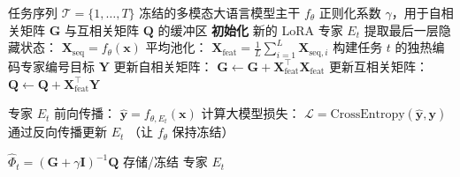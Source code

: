 \begin{algorithm}[t]
\caption{基于 CF-Router 的终身学习（训练阶段）。本算法为统一框架（算法~\ref{alg:cfcl}）在专家路由场景下的具体实例化：累积统计量 $\mathbf{G}$ 与第三章的 $\Psi^{-1}$ 之间满足 $\mathbf{G}=\Psi^{-1}-\gamma\mathbf{I}$，互相关矩阵 $\mathbf{Q}$ 与第三章 $\mathbf{Q}_t$ 同义；最终路由头 $\widehat{\Phi}_t=(\mathbf{G}+\gamma\mathbf{I})^{-1}\mathbf{Q}=\Psi_t\mathbf{Q}_t$ 与定理~\ref{thm:closed_form_recursive} 给出的递推结果严格等价。}
\label{alg:training}
\begin{algorithmic}[1]
\REQUIRE 任务序列 $\mathcal{T} = \{1, \dots, T\}$
\REQUIRE 冻结的多模态大语言模型主干 $f_\theta$
\REQUIRE 正则化系数 $\gamma$，用于自相关矩阵 $\mathbf{G}$ 与互相关矩阵 $\mathbf{Q}$ 的缓冲区
    \STATE \textbf{初始化} 新的 LoRA 专家 $E_t$
    \STATE {}
        \STATE 提取最后一层隐藏状态： $\mathbf{X}_{\mathrm{seq}} = f_\theta(\mathbf{x})$
        \STATE 平均池化： $\mathbf{X}_{\mathrm{feat}} = \frac{1}{L}\sum_{i=1}^{L}\mathbf{X}_{\mathrm{seq},i}$
        \STATE 构建任务 $t$ 的独热编码专家编号目标 $\mathbf{Y}$
        \STATE 更新自相关矩阵： $\mathbf{G} \leftarrow \mathbf{G} + \mathbf{X}_{\mathrm{feat}}^{\top}\mathbf{X}_{\mathrm{feat}}$
        \STATE 更新互相关矩阵： $\mathbf{Q} \leftarrow \mathbf{Q} + \mathbf{X}_{\mathrm{feat}}^{\top}\mathbf{Y}$
    \ENDFOR

    \STATE {}
        \STATE 专家 $E_t$ 前向传播： $\hat{\mathbf{y}} = f_{\theta, E_t}(\mathbf{x})$
        \STATE 计算大模型损失： $\mathcal{L} = \text{CrossEntropy}(\hat{\mathbf{y}}, \mathbf{y})$
        \STATE 通过反向传播更新 $E_t$ （让 $f_\theta$ 保持冻结）
    \ENDFOR

    \STATE {}
    \STATE $\widehat{\Phi}_t = (\mathbf{G} + \gamma \mathbf{I})^{-1} \mathbf{Q}$
    \STATE 存储/冻结 专家 $E_t$
\ENDFOR
\end{algorithmic}
\end{algorithm}

